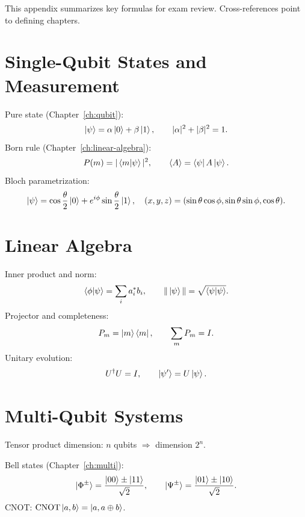 This appendix summarizes key formulas for exam review. Cross-references point to defining chapters.

\section{Single-Qubit States and Measurement}

Pure state (Chapter~\ref{ch:qubit}):
\begin{equation}
\ket{\psi}=\alpha\ket{0}+\beta\ket{1},\qquad |\alpha|^2+|\beta|^2=1.
\end{equation}
Born rule (Chapter~\ref{ch:linear-algebra}):
\begin{equation}
P(m)=|\braket{m|\psi}|^2,\qquad \langle A\rangle=\bra{\psi}A\ket{\psi}.
\end{equation}
Bloch parametrization:
\begin{equation}
\ket{\psi}=\cos\frac{\theta}{2}\ket{0}+e^{i\phi}\sin\frac{\theta}{2}\ket{1},\quad
(x,y,z)=(\sin\theta\cos\phi,\sin\theta\sin\phi,\cos\theta).
\end{equation}

\section{Linear Algebra}

Inner product and norm:
\begin{equation}
\braket{\phi|\psi}=\sum_i a_i^* b_i,\qquad \|\ket{\psi}\|=\sqrt{\braket{\psi|\psi}}.
\end{equation}
Projector and completeness:
\begin{equation}
P_m=\ket{m}\bra{m},\qquad \sum_m P_m=I.
\end{equation}
Unitary evolution:
\begin{equation}
U^\dagger U=I,\qquad \ket{\psi'}=U\ket{\psi}.
\end{equation}

\section{Multi-Qubit Systems}

Tensor product dimension: $n$ qubits $\Rightarrow$ dimension $2^n$.

Bell states (Chapter~\ref{ch:multi}):
\begin{equation}
\ket{\Phi^\pm}=\frac{\ket{00}\pm\ket{11}}{\sqrt2},\qquad
\ket{\Psi^\pm}=\frac{\ket{01}\pm\ket{10}}{\sqrt2}.
\end{equation}
CNOT: $\mathrm{CNOT}\ket{a,b}=\ket{a,a\oplus b}$.

